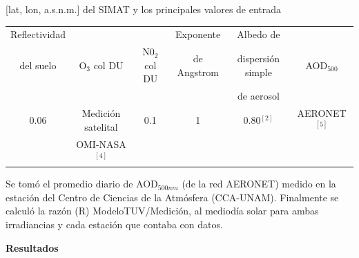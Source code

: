 \documentclass{article}
\begin{document}
\begin{minipage}{0.53\linewidth}
[lat, lon, a.s.n.m.] del SIMAT y los principales valores de entrada
\begin{center}
\changefontsizes{8.5pt}
\begin{tabular}{|c|c|c|c|c|c|} \hline
Reflectividad & & & Exponente & Albedo de &  \\
del suelo &O$_3$ col DU &N0$_2$ col DU &de Angstrom &  dispersión simple &AOD$_{500}$ \\
& & && de aerosol&  \\ \hline
0.06 & Medición satelital & 0.1 & 1 & 0.80$^{[2]}$ & AERONET$^{[5]}$ \\
& OMI-NASA$^{[4]}$ & &&& \\ \hline
\end{tabular}
\end{center}
Se tomó el promedio diario de AOD$_{500nm}$ (de la red AERONET) medido
en la estación del Centro de Ciencias de la Atmósfera (CCA-UNAM).
Finalmente se calculó la razón (R) ModeloTUV/Medición, al mediodía
solar para ambas irradiancias y cada estación que contaba con datos.
\end{minipage}
\begin{center}
\begin{shaded}
\textbf{\textcolor{ver}{Resultados}}
\end{shaded}
\end{center}
\end{document}
